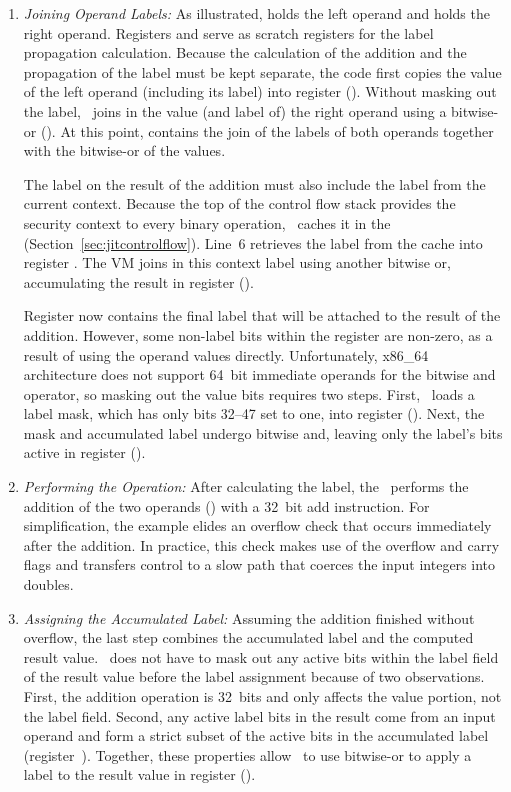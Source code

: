 \begin{enumerate}

\item \textit{Joining Operand Labels:}
As illustrated,  holds the left operand and  holds the right operand.
Registers  and  serve as scratch registers for the label propagation calculation.
Because the calculation of the addition and the propagation of the label must be kept separate, the code first copies the value of the left operand (including its label) into register  ().
Without masking out the label, \JitFlow\ joins in the value (and label of) the right operand using a bitwise-or ().
At this point,  contains the join of the labels of both operands together with the bitwise-or of the values.

The label on the result of the addition must also include the label from the current context.
Because the top of the control flow stack provides the security context to every binary operation, \JitFlow\ caches it in the  (Section~\ref{sec:jitcontrolflow}).
Line~6 retrieves the label from the cache into register .
The VM joins in this context label using another bitwise or, accumulating the result in register  ().

Register  now contains the final label that will be attached to the result of the addition.
However, some non-label bits within the register are non-zero, as a result of using the operand values directly.
Unfortunately, x86\_64 architecture does not support 64~bit immediate operands for the bitwise and operator, so masking out the value bits requires two steps.
First, \JitFlow\ loads a label mask, which has only bits 32--47 set to one, into register  ().
Next, the mask and accumulated label undergo bitwise and, leaving only the label's bits active in register  ().

\item \textit{Performing the Operation:}
After calculating the label, the \JitFlow\ performs the addition of the two operands () with a 32~bit add instruction.
For simplification, the example elides an overflow check that occurs immediately after the addition.
In practice, this check makes use of the overflow and carry flags and transfers control to a slow path that coerces the input integers into doubles.

\item \textit{Assigning the Accumulated Label:}
Assuming the addition finished without overflow, the last step combines the accumulated label and the computed result value.
\JitFlow\ does not have to mask out any active bits within the label field of the result value before the label assignment because of two observations.
First, the addition operation is 32~bits and only affects the value portion, not the label field.
Second, any active label bits in the result come from an input operand and form a strict subset of the active bits in the accumulated label (register~).
Together, these properties allow \JitFlow\ to use bitwise-or to apply a label to the result value in register  ().


\end{enumerate}
